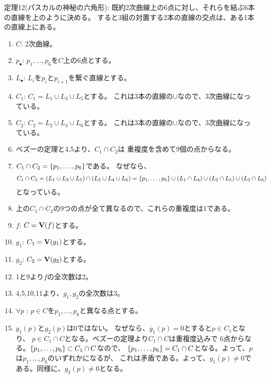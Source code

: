 \begin{framed}
  定理12(パスカルの神秘の六角形):
  既約2次曲線上の6点に対し、それらを結ぶ6本の直線を上のように決める。
  すると3組の対置する2本の直線の交点は、ある1本の直線上にある。
\end{framed}
\begin{myproof}
  \begin{enumerate}
    \item $C$: 2次曲線。
    \item $p_\bullet$: $p_1,\dots,p_6$を$C$上の6点とする。
    \item $L_\bullet$: $L_i$を$p_i$と$p_{i+1}$を繋ぐ直線とする。
    \item $C_1$: $C_1 = L_1 \cup L_3 \cup L_5$とする。
    これは3本の直線の$\cup$なので、3次曲線になっている。
    \item $C_2$: $C_2 = L_2 \cup L_4 \cup L_6$とする。
    これは3本の直線の$\cup$なので、3次曲線になっている。
    \item
    ベズーの定理と4,5より、$C_1 \cap C_2$は
    重複度を含めて9個の点からなる。
    \item
    $C_1 \cap C_2 = \left\{p_1,\dots,p_6\right\}$である。
    なぜなら、
    \begin{align}
      C_1 \cap C_2
      =
      (L_1 \cup L_3 \cup L_5)\cap (L_2 \cup L_4 \cup L_6)
      =
      \left\{p_1,\dots,p_6\right\} \cup (L_1\cap L_4)\cup  (L_2 \cap L_5) \cup (L_3 \cap L_6)
    \end{align}
    となっている。
    \item
    上の$C_1\cap C_2$の9つの点が全て異なるので、これらの重複度は1である。
    \item
    $f$: $C=\textbf V(f)$とする。
    \item
    $g_1$: $C_1 = \textbf V(g_1)$とする。
    \item
    $g_2$: $C_2 = \textbf V(g_2)$とする。
    \item
    1と9より$f$の全次数は2。
    \item
    4,5,10,11より、$g_1,g_2$の全次数は3。
    \item
    $\forall p$ : $p\in C$を$p_1,\dots,p_6$と異なる点とする。
    \item
    $g_1(p)$と$g_2(p)$は0ではない。
    なぜなら、$g_1(p)=0$とすると$p\in C_1$となり、
    $p\in C_1 \cap C$となる。ベズーの定理より$C_1 \cap C$は重複度込みで
    6点からなる。$\left\{p_1,\dots,p_6\right\}\subset C_1 \cap C$なので、
    $\left\{p_1,\dots,p_6\right\} = C_1 \cap C$となる。よって、$p$は$p_1,\dots,p_6$のいずれかになるが、
    これは矛盾である。よって、$g_1(p) \neq 0$である。同様に、$g_2(p) \neq 0$となる。

\end{enumerate}
\end{myproof}
